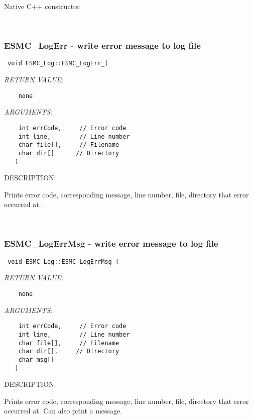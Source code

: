      Native C++ constructor 
 
\mbox{}\hrulefill\ 
 
\subsubsection [ESMC\_LogErr] {ESMC\_LogErr - write error message to log file}


  
\begin{verbatim} 
 void ESMC_Log::ESMC_LogErr_(
 \end{verbatim}{\em RETURN VALUE:}
\begin{verbatim}    none\end{verbatim}{\em ARGUMENTS:}
\begin{verbatim} 
    int errCode,     // Error code
    int line,        // Line number
    char file[],     // Filename
    char dir[]      // Directory
   )\end{verbatim}
{\sf DESCRIPTION:\\ }


   Prints error code, corresponding message, line number, file, directory
   that error occurred at.  
 
\mbox{}\hrulefill\ 
 
\subsubsection [ESMC\_LogErrMsg] {ESMC\_LogErrMsg - write error message to log file}


  
\begin{verbatim} 
 void ESMC_Log::ESMC_LogErrMsg_(
 \end{verbatim}{\em RETURN VALUE:}
\begin{verbatim}    none\end{verbatim}{\em ARGUMENTS:}
\begin{verbatim} 
    int errCode,     // Error code
    int line,        // Line number
    char file[],     // Filename
    char dir[],     // Directory
    char msg[]
   )\end{verbatim}
{\sf DESCRIPTION:\\ }


   Prints error code, corresponding message, line number, file, directory
   that error occurred at.  Can also print a message. 
 

